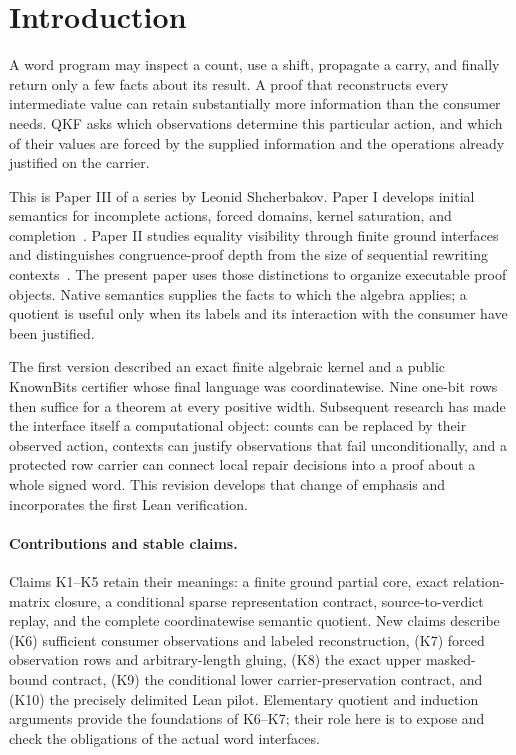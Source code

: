 \section{Introduction}\label{sec:intro}

A word program may inspect a count, use a shift, propagate a carry, and finally return only a few facts about its result. A proof that reconstructs every intermediate value can retain substantially more information than the consumer needs. QKF asks which observations determine this particular action, and which of their values are forced by the supplied information and the operations already justified on the carrier.

This is Paper III of a series by Leonid Shcherbakov. Paper I develops initial semantics for incomplete actions, forced domains, kernel saturation, and completion~\cite{ShcherbakovI}. Paper II studies equality visibility through finite ground interfaces and distinguishes congruence-proof depth from the size of sequential rewriting contexts~\cite{ShcherbakovII}. The present paper uses those distinctions to organize executable proof objects. Native semantics supplies the facts to which the algebra applies; a quotient is useful only when its labels and its interaction with the consumer have been justified.

The first version described an exact finite algebraic kernel and a public KnownBits certifier whose final language was coordinatewise. Nine one-bit rows then suffice for a theorem at every positive width. Subsequent research has made the interface itself a computational object: counts can be replaced by their observed action, contexts can justify observations that fail unconditionally, and a protected row carrier can connect local repair decisions into a proof about a whole signed word. This revision develops that change of emphasis and incorporates the first Lean verification.

\paragraph{Contributions and stable claims.}
Claims K1--K5 retain their meanings: a finite ground partial core, exact relation-matrix closure, a conditional sparse representation contract, source-to-verdict replay, and the complete coordinatewise semantic quotient. New claims describe (K6) sufficient consumer observations and labeled reconstruction, (K7) forced observation rows and arbitrary-length gluing, (K8) the exact upper masked-bound contract, (K9) the conditional lower carrier-preservation contract, and (K10) the precisely delimited Lean pilot. Elementary quotient and induction arguments provide the foundations of K6--K7; their role here is to expose and check the obligations of the actual word interfaces.

